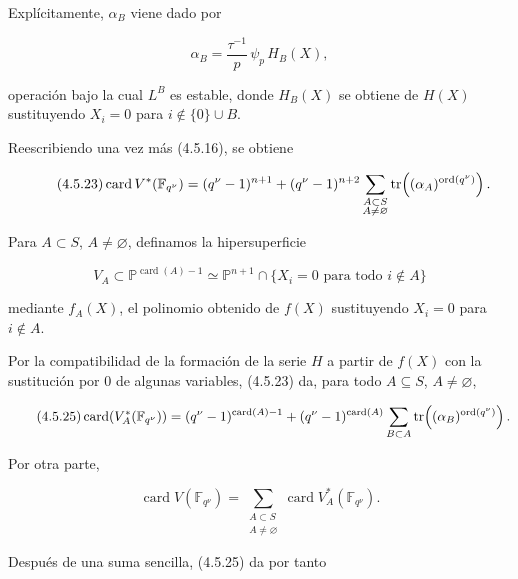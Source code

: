 Explícitamente, $\alpha_B$ viene dado por

\begin{equation}\tag{4.5.22}
\alpha_B=\frac{\tau^{-1}}p\,\psi_p\,H_B(X),
\end{equation}

operación bajo la cual $L^B$ es estable, donde $H_B(X)$ se obtiene de
$H(X)$ sustituyendo $X_i=0$ para $i\notin\{0\}\cup B$.

Reescribiendo una vez más (4.5.16), se obtiene

\begin{equation}\tag{\sisi{4.5.2.3}{4.5.23}}
\operatorname{card}V^*(\mathbb F_{q^\nu})
=(q^\nu-1)^{n+1}
+(q^\nu-1)^{n+2}
\sum_{\substack{A\subset S\\A\ne\varnothing}}
\operatorname{tr}\!\left((\alpha_A)^{\operatorname{ord}(q^\nu)}\right).
\end{equation}

Para $A\subset S$, $A\ne\varnothing$, definamos la hipersuperficie

\begin{equation}\tag{4.5.24}
V_A\subset\mathbb P^{\operatorname{card}(A)-1}
\simeq
\mathbb P^{n+1}\cap
\{X_i=0\text{ para todo }i\notin A\}
\end{equation}

mediante $f_A(X)$, el polinomio obtenido de $f(X)$ sustituyendo $X_i=0$
para $i\notin A$.

\pageoriginale

Por la compatibilidad de la formación de la serie $H$ a partir de $f(X)$
con la sustitución por $0$ de algunas variables, (4.5.23) da, para todo
$A\subseteq S$, $A\ne\varnothing$,

\begin{equation}\tag{4.5.25}
\operatorname{card}(V_A^*(\mathbb F_{q^\nu}))
=(q^\nu-1)^{\sisi{\operatorname{car}(A)}{\operatorname{card}(A)}-1}
+(q^\nu-1)^{\operatorname{card}(A)}
\sum_{B\subset A}
\operatorname{tr}\!\left(\sisi{(\alpha_B))}{(\alpha_B)}^{\operatorname{ord}(q^\nu)}\right).
\end{equation}

Por otra parte,

\begin{equation}\tag{4.5.26}
\operatorname{card}V(\mathbb F_{q^\nu})
=\sum_{\substack{A\subset S\\A\ne\varnothing}}
\operatorname{card}V_A^*(\mathbb F_{q^\nu}).
\end{equation}

Después de una suma sencilla, (4.5.25) da por tanto

